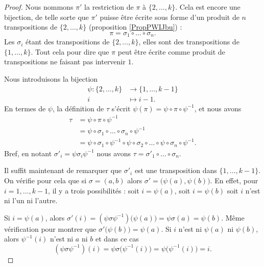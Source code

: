 \begin{proof}
	Nous nommons \( \pi'\) la restriction de \( \pi\) à \( \{ 2,\ldots,k \}\). Cela est encore une bijection, de telle sorte que \( \pi'\) puisse être écrite sous forme d'un produit de \( n\) transpositions de \( \{ 2,\ldots,k \}\) (proposition \ref{PropPWIJbu}) :
	\begin{equation}
		\pi=\sigma_1\circ\ldots\circ\sigma_n.
	\end{equation}
	Les \( \sigma_i\) étant des transpositions de \( \{ 2,\ldots,k \}\), elles sont des transpositions de \( \{ 1,\ldots,k \}\). Tout cela pour dire que \( \pi\) peut être écrite comme produit de transpositions ne faisant pas intervenir \( 1\).

	Nous introduisons la bijection
	\begin{equation}
		\begin{aligned}
			\psi\colon \{ 2,\ldots,k \} & \to \{ 1,\ldots,k-1 \} \\
			i                           & \mapsto i-1.
		\end{aligned}
	\end{equation}
	En termes de \( \psi\), la définition de \( \tau\) s'écrit \( \psi(\pi)=\psi\circ \pi\circ\psi^{-1}\), et nous avons
	\begin{subequations}
		\begin{align}
			\tau & =\psi\circ \pi\circ\psi^{-1}                                                                           \\
			     & =\psi\circ\sigma_1\circ\ldots\circ\sigma_n\circ\psi^{-1}                                               \\
			     & =\psi\circ\sigma_1\circ\psi^{-1}\circ\psi\circ\sigma_2\circ\ldots\circ\psi\circ\sigma_n\circ\psi^{-1}.
		\end{align}
	\end{subequations}
	Bref, en notant \( \sigma'_i=\psi\sigma_i\psi^{-1}\) nous avons \( \tau=\sigma'_1\circ\ldots\circ\sigma_n\).

	Il suffit maintenant de remarquer que \( \sigma'_i\) est une transposition dans \( \{ 1,\ldots,k-1 \}\). On vérifie pour cela que si \( \sigma=(a,b)\) alors \( \sigma'=\big( \psi(a),\psi(b) \big)\). En effet, pour \( i=1,\ldots,k-1\), il y a trois possibilités : soit \( i=\psi(a)\), soit \( i=\psi(b)\) soit \( i\) n'est ni l'un ni l'autre.

	Si \( i=\psi(a)\), alors \( \sigma'(i)=(\psi\sigma\psi^{-1})\big( \psi(a) \big)=\psi\sigma(a)=\psi(b)\). Même vérification pour montrer que \( \sigma'\big( \psi(b) \big)=\psi(a)\). Si \( i\) n'est ni \( \psi(a)\) ni \( \psi(b)\), alors \( \psi^{-1}(i)\) n'est ni \( a\) ni \( b\) et dans ce cas
	\begin{equation}
		(\psi\sigma\psi^{-1})(i)=\psi\sigma\big( \psi^{-1}(i) \big)=\psi\big( \psi^{-1}(i) \big)=i.
	\end{equation}


\end{proof}
